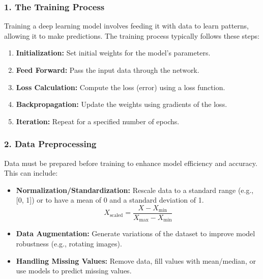 \documentclass[aspectratio=169]{beamer}
\begin{document}
\begin{frame}[fragile]
    \frametitle{1. The Training Process}
    Training a deep learning model involves feeding it with data to learn patterns, allowing it to make predictions. The training process typically follows these steps:
    
    \begin{enumerate}
        \item \textbf{Initialization:} Set initial weights for the model's parameters.
        \item \textbf{Feed Forward:} Pass the input data through the network.
        \item \textbf{Loss Calculation:} Compute the loss (error) using a loss function.
        \item \textbf{Backpropagation:} Update the weights using gradients of the loss.
        \item \textbf{Iteration:} Repeat for a specified number of epochs.
    \end{enumerate}
\end{frame}

\begin{frame}[fragile]
    \frametitle{2. Data Preprocessing}
    Data must be prepared before training to enhance model efficiency and accuracy. This can include:
    
    \begin{itemize}
        \item \textbf{Normalization/Standardization:} 
        Rescale data to a standard range (e.g., [0, 1]) or to have a mean of 0 and a standard deviation of 1.
        \begin{equation}
            X_{\text{scaled}} = \frac{X - X_{\text{min}}}{X_{\text{max}} - X_{\text{min}}}
        \end{equation}
        
        \item \textbf{Data Augmentation:} Generate variations of the dataset to improve model robustness (e.g., rotating images).

        \item \textbf{Handling Missing Values:} Remove data, fill values with mean/median, or use models to predict missing values.
    \end{itemize}
\end{frame}
\end{document}
